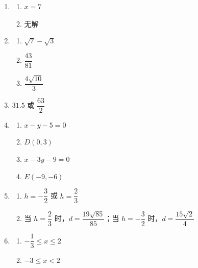 \documentclass[12pt,a4paper]{exam-zh}
\begin{document}
\begin{enumerate}[label=\textbf{\arabic*.},leftmargin=2.5em,itemsep=0.8em]
    \item
    \begin{enumerate}[label=(\alph*),leftmargin=2em,itemsep=0.25em]
        \item $x = 7$
        \item 无解
    \end{enumerate}

    \item
    \begin{enumerate}[label=(\alph*),leftmargin=2em,itemsep=0.25em]
        \item $\sqrt{7} - \sqrt{3}$
        \item $\dfrac{43}{81}$
        \item $\dfrac{4\sqrt{10}}{3}$
    \end{enumerate}

    \item $31.5$ 或 $\dfrac{63}{2}$

    \item
    \begin{enumerate}[label=(\alph*),leftmargin=2em,itemsep=0.25em]
        \item $x - y - 5 = 0$
        \item $D(0, 3)$
        \item $x - 3y - 9 = 0$
        \item $E(-9, -6)$
    \end{enumerate}

    \item
    \begin{enumerate}[label=(\alph*),leftmargin=2em,itemsep=0.25em]
        \item $h = -\dfrac{3}{2}$ 或 $h = \dfrac{2}{3}$
        \item 当 $h = \dfrac{2}{3}$ 时，$d = \dfrac{19\sqrt{85}}{85}$；当 $h = -\dfrac{3}{2}$ 时，$d = \dfrac{15\sqrt{2}}{4}$
    \end{enumerate}

    \item
    \begin{enumerate}[label=(\alph*),leftmargin=2em,itemsep=0.25em]
        \item $-\dfrac{1}{3} \le x \le 2$
        \item $-3 \le x < 2$
    \end{enumerate}
\end{enumerate}
\end{document}
